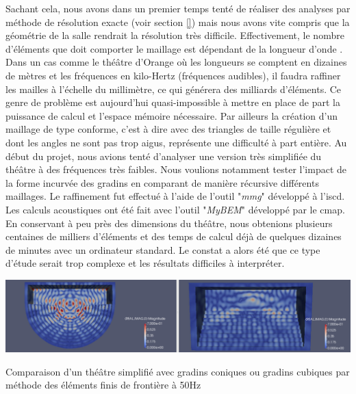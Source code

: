 Sachant cela, nous avons dans un premier temps tenté de réaliser des analyses par méthode de résolution exacte (voir section \ref{}) mais nous avons vite compris que la géométrie de la salle rendrait la résolution très difficile. Effectivement, le nombre d'éléments que doit comporter le maillage est dépendant de la longueur d'onde \cite[p. 740]{beamtracing}. Dans un cas comme le théâtre d'Orange où les longueurs se comptent en dizaines de mètres et les fréquences en kilo-Hertz (fréquences audibles), il faudra raffiner les mailles à l'échelle du millimètre, ce qui générera des milliards d'éléments. Ce genre de problème est aujourd'hui quasi-impossible à mettre en place de part la puissance de calcul et l'espace mémoire nécessaire. Par ailleurs la création d'un maillage de type conforme, c'est à dire avec des triangles de taille régulière et dont les angles ne sont pas trop aigus, représente une difficulté à part entière.
Au début du projet, nous avions tenté d'analyser une version très simplifiée du théâtre à des fréquences très faibles. Nous voulions notamment tester l'impact de la forme incurvée des gradins en comparant de manière récursive différents maillages. Le raffinement fut effectué à l'aide de l'outil "\textit{mmg}" développé à l'\gls{iscd}. Les calculs acoustiques ont été fait avec l'outil "\textit{MyBEM}" développé par le \gls{cmap}. En conservant à peu près des dimensions du théâtre, nous obtenions plusieurs centaines de milliers d'éléments et des temps de calcul déjà de quelques dizaines de minutes avec un ordinateur standard. Le constat a alors été que ce type d'étude serait trop complexe et les résultats difficiles à interpréter.

\begin{figureth}
	\includegraphics[width=\linewidth]{images/BEM}
	\caption{Comparaison d'un théâtre simplifié avec gradins coniques ou gradins cubiques par méthode des éléments finis de frontière à 50Hz}
	\label{BEM}
\end{figureth}


